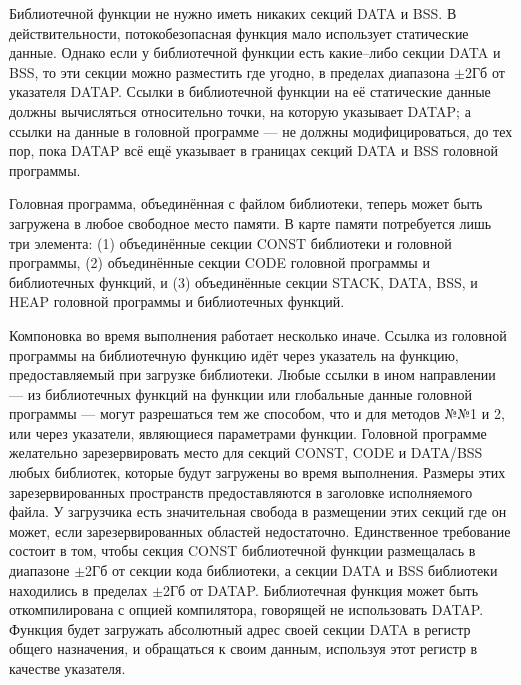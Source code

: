 \documentclass[forwardcom.tex]{subfiles}
\begin{document}
Библиотечной функции не нужно иметь никаких секций DATA и BSS. В действительности, потокобезопасная функция мало использует статические данные. Однако если у библиотечной функции есть какие--либо секции DATA и BSS, то эти секции можно разместить где угодно, в пределах диапазона $\pm$2Гб от указателя DATAP. Ссылки в библиотечной функции на её статические данные должны вычисляться относительно точки, на которую указывает DATAP; а ссылки  на данные в головной программе --- не должны модифицироваться, до тех пор, пока DATAP всё ещё указывает в границах секций  DATA и BSS головной программы. 

Головная программа, объединённая с файлом библиотеки, теперь может быть загружена в любое свободное место памяти. В карте памяти потребуется лишь три  элемента: (1) объединённые секции CONST библиотеки и головной программы, (2) объединённые секции CODE головной программы и библиотечных функций, и (3) объединённые секции STACK, DATA, BSS, и HEAP головной программы и библиотечных функций.

Компоновка во время выполнения работает несколько иначе. Ссылка из головной программы на библиотечную функцию идёт через указатель на функцию, предоставляемый при загрузке библиотеки. Любые ссылки в ином направлении --- из библиотечных функций на функции или глобальные данные головной программы --- могут разрешаться тем же способом, что и для методов №№1 и 2, или через указатели, являющиеся параметрами функции. Головной программе желательно зарезервировать место для секций CONST, CODE и DATA/BSS любых библиотек, которые будут загружены во время выполнения. Размеры этих зарезервированных пространств предоставляются в заголовке исполняемого файла. У загрузчика есть значительная свобода в размещении этих секций где он может, если зарезервированных областей недостаточно. Единственное требование состоит в том, чтобы секция CONST библиотечной функции размещалась в диапазоне $\pm$2Гб от секции кода библиотеки, а секции DATA и BSS библиотеки находились в пределах $\pm$2Гб от DATAP. Библиотечная функция может быть откомпилирована с опцией компилятора, говорящей не использовать DATAP. Функция будет загружать абсолютный адрес своей секции DATA в регистр общего назначения, и обращаться к своим данным, используя этот регистр в качестве указателя.
\end{document}
